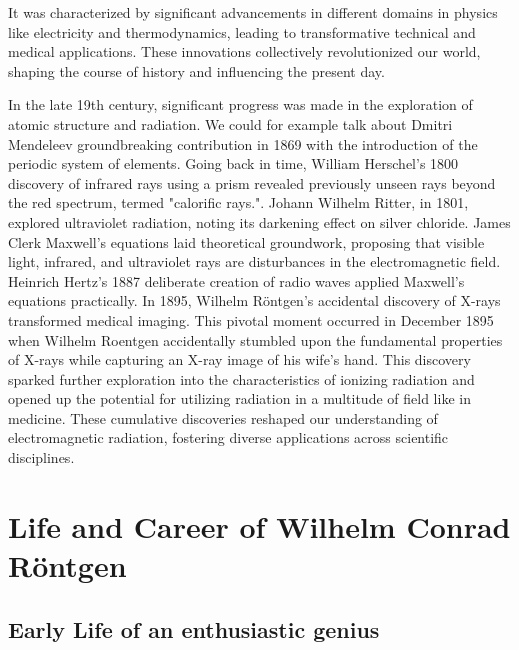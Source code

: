 \documentclass[a4paper,12pt]{report}
\begin{document}
It was characterized by significant advancements in different domains in physics like electricity
and thermodynamics, leading to transformative technical and medical applications. These
innovations collectively revolutionized our world, shaping the course of history and influencing
the present day.

In the late 19th century, significant progress was made in the exploration of atomic structure and
radiation. We could for example talk about Dmitri Mendeleev groundbreaking contribution in
1869 with the introduction of the periodic system of elements. Going back in time, William
Herschel's 1800 discovery of infrared rays using a prism revealed previously unseen rays beyond
the red spectrum, termed "calorific rays.". Johann Wilhelm Ritter, in 1801, explored ultraviolet
radiation, noting its darkening effect on silver chloride. James Clerk Maxwell's equations laid
theoretical groundwork, proposing that visible light, infrared, and ultraviolet rays are
disturbances in the electromagnetic field. Heinrich Hertz's 1887 deliberate creation of radio
waves applied Maxwell's equations practically. In 1895, Wilhelm Röntgen's accidental discovery
of X-rays transformed medical imaging. This pivotal moment occurred in December 1895 when
Wilhelm Roentgen accidentally stumbled upon the fundamental properties of X-rays while
capturing an X-ray image of his wife's hand. This discovery sparked further exploration into the
characteristics of ionizing radiation and opened up the potential for utilizing radiation in a
multitude of field like in medicine. These cumulative discoveries reshaped our understanding of
electromagnetic radiation, fostering diverse applications across scientific disciplines.

\chapter{Life and Career of Wilhelm Conrad Röntgen}
\section{Early Life of an enthusiastic genius}
\end{document}
